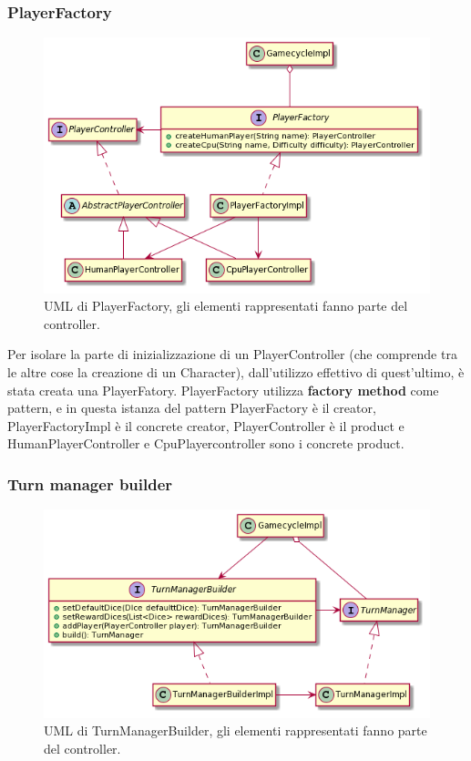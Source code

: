 \documentclass[a4paper,12pt]{report}
\begin{document}
    \subsubsection{PlayerFactory}
    \begin{figure}[h]
    \centering{}
    \includegraphics[width=\textwidth]{images/freddi/PlayerFactory.png}
    \caption{UML di PlayerFactory, gli elementi rappresentati fanno parte del controller.}
    \end{figure}

    Per isolare la parte di inizializzazione di un PlayerController (che comprende tra le altre cose la creazione di un Character), dall'utilizzo effettivo di quest'ultimo, è stata creata una PlayerFatory.
    PlayerFactory utilizza \textbf{factory method} come pattern, e in questa istanza del pattern PlayerFactory è il creator, PlayerFactoryImpl è il concrete creator, PlayerController è il product e HumanPlayerController e CpuPlayercontroller sono i concrete product.

    \subsubsection{Turn manager builder}
    \begin{figure}[h]
    \centering{}
    \includegraphics[width=\textwidth]{images/freddi/TurnManagerBuilder.png}
    \caption{UML di TurnManagerBuilder, gli elementi rappresentati fanno parte del controller.}
    \end{figure}
\end{document}
